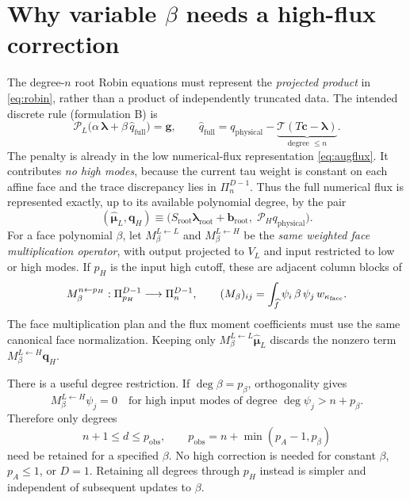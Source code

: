 \documentclass[11pt,letterpaper]{article}
\newcommand{\PP}{\mathcal P}
\newcommand{\Tau}{\mathcal T}
\newcommand{\lam}{\boldsymbol\lambda}
\newcommand{\muh}{\widehat{\boldsymbol\mu}}
\newcommand{\qhigh}{\mathbf q_H}
\newcommand{\bb}{\mathbf b}
\newcommand{\gvec}{\mathbf g}
\newcommand{\cc}{\mathbf c}
\begin{document}
\section{Why variable \texorpdfstring{$\beta$}{beta} needs a high-flux correction}
The degree-\(n\) root Robin equations must represent the \emph{projected product} in \eqref{eq:robin}, rather than a product of independently truncated data. The intended discrete rule (formulation B) is
\begin{equation}\label{eq:formB}
 \PP_L\bigl(\alpha\,\lam+\beta\,\widehat q_{\mathrm{full}}\bigr)=\gvec,
 \qquad \widehat q_{\mathrm{full}}=
 q_{\mathrm{physical}}-\underbrace{\Tau(T\cc-\lam)}_{\text{degree }\le n}.
\end{equation}
The penalty is already in the low numerical-flux representation \eqref{eq:augflux}. It contributes \emph{no high modes}, because the current tau weight is constant on each affine face and the trace discrepancy lies in \(\Pi_n^{D-1}\). Thus the full numerical flux is represented exactly, up to its available polynomial degree, by the pair
\begin{equation}\label{eq:fullpair}
 (\muh_L,\qhigh)\equiv
 \bigl(S_{\mathrm{root}}\lam_{\mathrm{root}}+\bb_{\mathrm{root}},\;\PP_H q_{\mathrm{physical}}\bigr).
\end{equation}
For a face polynomial \(\beta\), let \(M_\beta^{L\leftarrow L}\) and \(M_\beta^{L\leftarrow H}\) be the \emph{same weighted face multiplication operator}, with output projected to \(V_L\) and input restricted to low or high modes. If \(p_H\) is the input high cutoff, these are adjacent column blocks of
\begin{equation}\label{eq:rectM}
 M_\beta^{n\leftarrow p_H}:
 \Pi_{p_H}^{D-1}\longrightarrow\Pi_n^{D-1},\qquad
 (M_\beta)_{ij}=\int_{\widehat f}\psi_i\,\beta\,\psi_j\,w_{\kappa_{\rm face}}.
\end{equation}
The face multiplication plan and the flux moment coefficients must use the same canonical face normalization. Keeping only \(M_\beta^{L\leftarrow L}\muh_L\) discards the nonzero term \(M_\beta^{L\leftarrow H}\qhigh\).

There is a useful degree restriction. If \(\deg\beta=p_\beta\), orthogonality gives
\begin{equation}\label{eq:prune-degree}
 M_\beta^{L\leftarrow H}\psi_j=0
 \quad\text{for high input modes of degree }\deg\psi_j>n+p_\beta.
\end{equation}
Therefore only degrees
\begin{equation}\label{eq:obsdegree}
 n+1\le d\le p_{\mathrm{obs}},\qquad
 p_{\mathrm{obs}}=n+\min(p_A-1,p_\beta)
\end{equation}
need be retained for a specified \(\beta\). No high correction is needed for constant \(\beta\), \(p_A\le1\), or \(D=1\). Retaining all degrees through \(p_H\) instead is simpler and independent of subsequent updates to \(\beta\).
\end{document}
